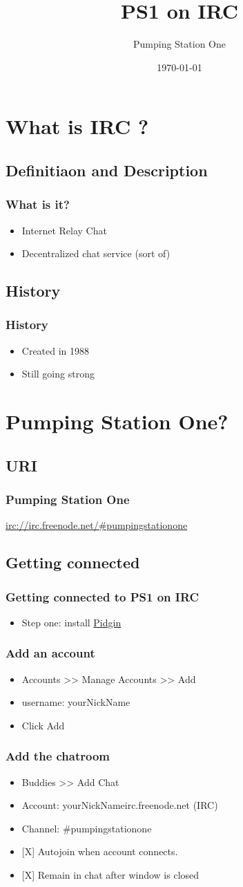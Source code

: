 \documentclass[hyperref={pdfpagelabels=false}]{beamer}
\title{PS1 on IRC}
\author{Pumping Station One}
\date{\today}
\begin{document}
\frame{\titlepage}
\section[Outline]{}
\frame{\tableofcontents}
\section{What is IRC ?}
	\subsection{Definitiaon and Description}
		\frame
		{
			\frametitle{What is it?}
			\begin{itemize}
				\item{Internet Relay Chat}
				\item{Decentralized chat service (sort of)}
			\end{itemize}
		}

	\subsection{History}
		\frame
		{
			\frametitle{History}
			\begin{itemize}
				\item{Created in 1988}
				\item{Still going strong}
			\end{itemize}
		}
\section{Pumping Station One?}
	\subsection{URI}
		\frame
		{
			\frametitle{Pumping Station One}
			\url{irc://irc.freenode.net/\#pumpingstationone}
		}
	\subsection{Getting connected}
		\frame
		{
			\frametitle{Getting connected to PS1 on IRC}
			\begin{itemize}
				\item{Step one: install \href{http://pidgin.im}{Pidgin}}
			\end{itemize}
		}
		\frame
		{
			\frametitle{Add an account}
			\begin{itemize}
				\item{Accounts >> Manage Accounts >> Add}
				\item{username: yourNickName}
				\item{Click Add}
			\end{itemize}
		}
		\frame
		{
			\frametitle{Add the chatroom}
			\begin{itemize}
				\item{Buddies >> Add Chat}
				\item{Account: yourNickName\makeatletter@\makeatother irc.freenode.net (IRC)}
				\item{Channel: \#pumpingstationone}
				\item{[X] Autojoin when account connects.}
				\item{[X] Remain in chat after window is closed}
			\end{itemize}
		}
\end{document}
